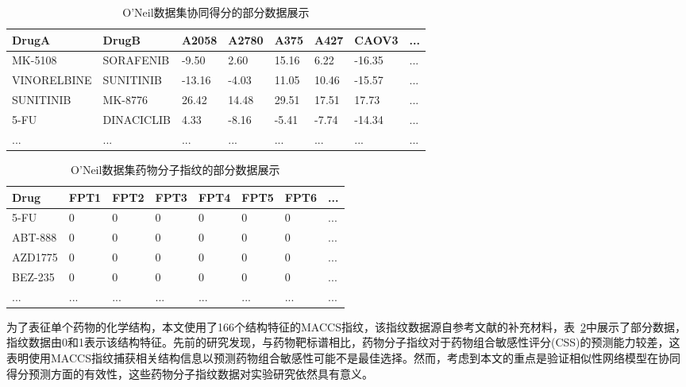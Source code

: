 \begin{table}[htbp]
  \centering
  \caption{O'Neil数据集协同得分的部分数据展示}
  \label{tb:ms}
  \small
  \begin{tabular}{p{2.5cm} p{2.4cm} p{1.2cm} p{1.2cm} p{1.1cm} p{1cm} p{1.2cm} p{0.5cm}}
    \toprule
    DrugA & DrugB & A2058 & A2780 & A375 & A427 & CAOV3 &  ... \\
    \midrule
    MK-5108 & SORAFENIB & -9.50 & 2.60 & 15.16 & 6.22 & -16.35 & ... \\
    VINORELBINE & SUNITINIB & -13.16 & -4.03 & 11.05 & 10.46 & -15.57 & ... \\
    SUNITINIB & MK-8776 & 26.42 & 14.48 & 29.51 & 17.51 & 17.73 & ... \\
    5-FU & DINACICLIB & 4.33 & -8.16 & -5.41 & -7.74 & -14.34 & ... \\
    ... & ... & ... & ... & ... & ... & ... & ... \\
    \bottomrule
  \end{tabular}
\end{table}

\begin{table}[htbp]
\centering
\caption{O'Neil数据集药物分子指纹的部分数据展示\label{tb:md}}
\small
\begin{tabular}{p{2.5cm} p{1.2cm} p{1.2cm} p{1.2cm} p{1.2cm} p{1.2cm} p{1.2cm} p{1.2cm}}
\toprule
Drug & FPT1 & FPT2 & FPT3 & FPT4 & FPT5 & FPT6 & ... \\
\midrule
5-FU & 0 & 0 & 0 & 0 & 0 & 0 & ... \\
ABT-888 & 0 & 0 & 0 & 0 & 0 & 0 & ... \\
AZD1775 & 0 & 0 & 0 & 0 & 0 & 0 & ... \\
BEZ-235 & 0 & 0 & 0 & 0 & 0 & 0 & ... \\
... & ... & ... & ... & ... & ... & ... & ... \\
\bottomrule
\end{tabular}
\end{table}

为了表征单个药物的化学结构，本文使用了166个结构特征的MACCS指纹，该指纹数据源自参考文献\cite{16}的补充材料，表~\ref{tb:md}中展示了部分数据，指纹数据由0和1表示该结构特征。先前的研究\cite{16}发现，与药物靶标谱相比，药物分子指纹对于药物组合敏感性评分(CSS)的预测能力较差，这表明使用MACCS指纹捕获相关结构信息以预测药物组合敏感性可能不是最佳选择。然而，考虑到本文的重点是验证相似性网络模型在协同得分预测方面的有效性，这些药物分子指纹数据对实验研究依然具有意义。

